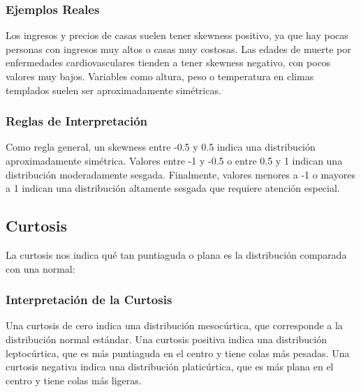 \documentclass[12pt]{article}
\begin{document}
\subsubsection{Ejemplos Reales}
Los ingresos y precios de casas suelen tener skewness positivo, ya que hay pocas personas con ingresos muy altos o casas muy costosas. Las edades de muerte por enfermedades cardiovasculares tienden a tener skewness negativo, con pocos valores muy bajos. Variables como altura, peso o temperatura en climas templados suelen ser aproximadamente simétricas.

\subsubsection{Reglas de Interpretación}
Como regla general, un skewness entre -0.5 y 0.5 indica una distribución aproximadamente simétrica. Valores entre -1 y -0.5 o entre 0.5 y 1 indican una distribución moderadamente sesgada. Finalmente, valores menores a -1 o mayores a 1 indican una distribución altamente sesgada que requiere atención especial.

\subsection{Curtosis}
La curtosis nos indica qué tan puntiaguda o plana es la distribución comparada con una normal:

\begin{center}
\end{center}

\subsubsection{Interpretación de la Curtosis}
Una curtosis de cero indica una distribución mesocúrtica, que corresponde a la distribución normal estándar. Una curtosis positiva indica una distribución leptocúrtica, que es más puntiaguda en el centro y tiene colas más pesadas. Una curtosis negativa indica una distribución platicúrtica, que es más plana en el centro y tiene colas más ligeras.
\end{document}
